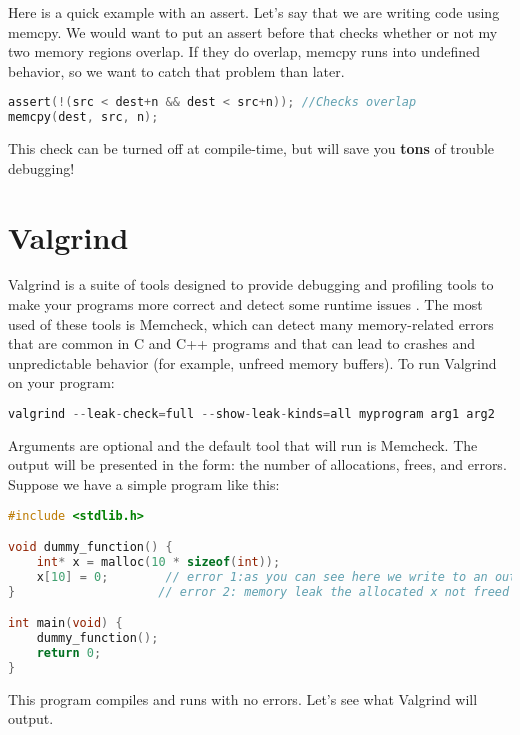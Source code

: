 Here is a quick example with an assert.
Let's say that we are writing code using memcpy.
We would want to put an assert before that checks whether or not my two memory regions overlap.
If they do overlap, memcpy runs into undefined behavior, so we want to catch that problem than later.

\begin{lstlisting}[language=C]
assert(!(src < dest+n && dest < src+n)); //Checks overlap
memcpy(dest, src, n);
\end{lstlisting}

This check can be turned off at compile-time, but will save you \textbf{tons} of trouble debugging!

\section{Valgrind}

Valgrind is a suite of tools designed to provide debugging and profiling tools to make your programs more correct and detect some runtime issues \cite{valgrind}.
The most used of these tools is Memcheck, which can detect many memory-related errors that are common in C and C++ programs and that can lead to crashes and unpredictable behavior (for example, unfreed memory buffers).
To run Valgrind on your program:

\begin{lstlisting}[language=C]
valgrind --leak-check=full --show-leak-kinds=all myprogram arg1 arg2
\end{lstlisting}

Arguments are optional and the default tool that will run is Memcheck.
The output will be presented in the form: the number of allocations, frees, and errors.
Suppose we have a simple program like this:

\begin{lstlisting}[language=C]
#include <stdlib.h>

void dummy_function() {
	int* x = malloc(10 * sizeof(int));
	x[10] = 0;        // error 1:as you can see here we write to an out of bound memory address
}                    // error 2: memory leak the allocated x not freed

int main(void) {
	dummy_function();
	return 0;
}
\end{lstlisting}

This program compiles and runs with no errors.
Let's see what Valgrind will output.

